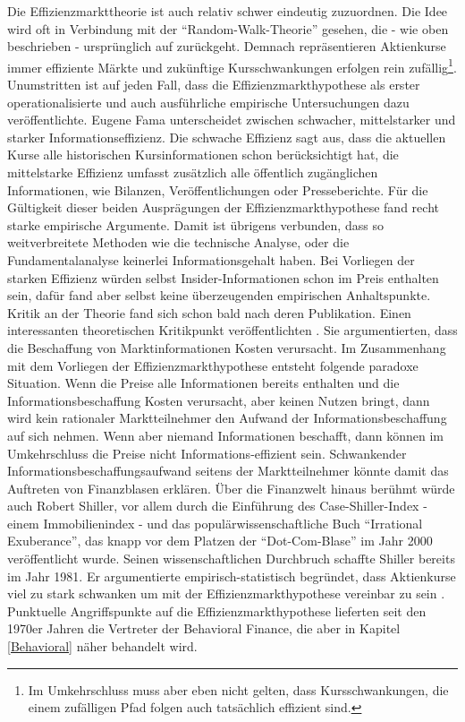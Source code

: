 Die Effizienzmarkttheorie ist auch relativ schwer eindeutig zuzuordnen. Die Idee wird oft in Verbindung mit der "`Random-Walk-Theorie"' gesehen, die - wie oben beschrieben - ursprünglich auf \textcite{Bachelier1900} zurückgeht. Demnach repräsentieren Aktienkurse immer effiziente Märkte und zukünftige Kursschwankungen erfolgen rein zufällig\footnote{Im Umkehrschluss muss aber eben nicht gelten, dass Kursschwankungen, die einem zufälligen Pfad folgen auch tatsächlich effizient sind.}. Unumstritten ist auf jeden Fall, dass \textcite{Fama1970} die Effizienzmarkthypothese als erster operationalisierte und auch ausführliche empirische Untersuchungen dazu veröffentlichte. Eugene Fama unterscheidet zwischen schwacher, mittelstarker und starker Informationseffizienz. Die schwache Effizienz sagt aus, dass die aktuellen Kurse alle historischen Kursinformationen schon berücksichtigt hat, die mittelstarke Effizienz umfasst zusätzlich alle öffentlich zugänglichen Informationen, wie Bilanzen, Veröffentlichungen oder Presseberichte. Für die Gültigkeit dieser beiden Ausprägungen der Effizienzmarkthypothese fand \textcite{Fama1970} recht starke empirische Argumente. Damit ist übrigens verbunden, dass so weitverbreitete Methoden wie die technische Analyse, oder die Fundamentalanalyse keinerlei Informationsgehalt haben. Bei Vorliegen der starken Effizienz würden selbst Insider-Informationen schon im Preis enthalten sein, dafür fand aber selbst \textcite{Fama1970} keine überzeugenden empirischen Anhaltspunkte.
Kritik an der Theorie fand sich schon bald nach deren Publikation. Einen interessanten theoretischen Kritikpunkt veröffentlichten \textcite{Grossman1980}. Sie argumentierten, dass die Beschaffung von Marktinformationen Kosten verursacht. Im Zusammenhang mit dem Vorliegen der Effizienzmarkthypothese entsteht folgende paradoxe Situation. Wenn die Preise alle Informationen bereits enthalten und die Informationsbeschaffung Kosten verursacht, aber keinen Nutzen bringt, dann wird kein rationaler Marktteilnehmer den Aufwand der Informationsbeschaffung auf sich nehmen. Wenn aber niemand Informationen beschafft, dann können im Umkehrschluss die Preise nicht Informations-effizient sein. Schwankender Informationsbeschaffungsaufwand seitens der Marktteilnehmer könnte damit das Auftreten von Finanzblasen erklären. Über die Finanzwelt hinaus berühmt würde auch Robert Shiller, vor allem durch die Einführung des Case-Shiller-Index - einem Immobilienindex - und das populärwissenschaftliche Buch "`Irrational Exuberance"', das knapp vor dem Platzen der "`Dot-Com-Blase"' im Jahr 2000 veröffentlicht wurde. Seinen wissenschaftlichen Durchbruch schaffte Shiller bereits im Jahr 1981. Er argumentierte empirisch-statistisch begründet, dass Aktienkurse viel zu stark schwanken um mit der Effizienzmarkthypothese vereinbar zu sein \parencite{Shiller1981}. Punktuelle Angriffspunkte auf die Effizienzmarkthypothese lieferten seit den 1970er Jahren die Vertreter der Behavioral Finance, die aber in Kapitel \ref{Behavioral} näher behandelt wird.

